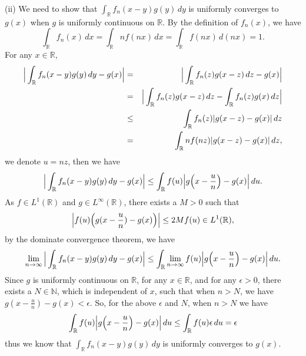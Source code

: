 \documentclass[12pt,a4paper]{ctexart}
\begin{document}
(ii) We need to show that $\int_{\mathbb{R}}^{} f_{n}(x - y) g(y) \, d y$ is uniformly converges to $g(x)$ when $g$ is uniformly continuous on $\mathbb{R}$. By the definition of $f_{n}(x)$, we have
\begin{equation*}
    \int_{\mathbb{R}}^{} f_{n}(x) \, d x = \int_{\mathbb{R}}^{} n f(n x) \, d x = \int_{\mathbb{R}}^{} f(n x) \, d (n x) = 1.
\end{equation*}
For any $x \in \mathbb{R}$,
\begin{eqnarray*}
    \Big{|} \int_{\mathbb{R}}^{} f_{n}(x - y) g(y) \, d y - g(x) \Big{|} & = &  \Big{|} \int_{\mathbb{R}}^{}  f_{n}(z) g(x - z) \, d z - g(x) \Big{|} \\
    & = & \Big{|} \int_{\mathbb{R}}^{}  f_{n}(z) g(x - z) \, d z - \int_{\mathbb{R}}^{}  f_{n}(z) g(x) \, d z \Big{|} \\
    & \leq &  \int_{\mathbb{R}}^{}  f_{n}(z) | g(x - z) - g(x) | \, d z \\
    & = & \int_{\mathbb{R}}^{} n f(n z) | g(x - z) - g(x) | \, d z,
\end{eqnarray*}
we denote $ u = n z$, then we have
\begin{equation*}
    \Big{|} \int_{\mathbb{R}}^{} f_{n}(x - y) g(y) \, d y - g(x) \Big{|} \leq \int_{\mathbb{R}}^{}  f(u) \Big{|} g \Big{(} x - \frac{u}{n} \Big{)} - g(x) \Big{|} \, d u.
\end{equation*}
As $f \in L^{1}(\mathbb{R})$ and $g \in L^{\infty}(\mathbb{R})$, there exists a $M > 0$ such that
\begin{equation*}
    \Big{|} f(u) \Big{(} g(x - \frac{u}{n}) - g(x)\Big{)} \Big{|} \leq 2M f(u) \in L^{1}(\mathbb{R}),
\end{equation*}
by the dominate convergence theorem, we have
\begin{equation*}
    \lim_{n \to \infty} \Big{|} \int_{\mathbb{R}}^{} f_{n}(x - y) g(y) \, d y - g(x) \Big{|} \leq \int_{\mathbb{R}}^{}  \lim_{n \to \infty} f(u) \Big{|} g \Big{(} x - \frac{u}{n} \Big{)} - g(x) \Big{|} \, d u.
\end{equation*}
Since $g$ is uniformly continuous on $\mathbb{R}$, for any $x \in \mathbb{R}$, and for any $\epsilon > 0$, there exists a $N \in \mathbb{N}$, which is independent of $x$, such that when $n > N$, we have $g ( x - \frac{u}{n} ) - g(x) < \epsilon $. So, for the above $\epsilon$ and $N$, when $n > N$ we have
\begin{equation*}
    \int_{\mathbb{R}}^{} f(u) \Big{|} g \Big{(} x - \frac{u}{n} \Big{)} - g(x) \Big{|} \, d u \leq \int_{\mathbb{R}}^{} f(u) \epsilon \, d u = \epsilon
\end{equation*}
thus we know that $\int_{\mathbb{R}}^{} f_{n}(x - y) g(y) \, d y$ is uniformly converges to $g(x)$.
\end{document}
